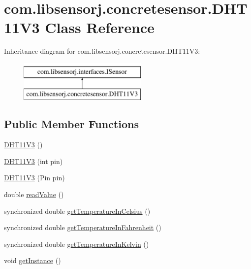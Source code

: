 \hypertarget{classcom_1_1libsensorj_1_1concretesensor_1_1DHT11V3}{}\section{com.\+libsensorj.\+concretesensor.\+D\+H\+T11\+V3 Class Reference}
\label{classcom_1_1libsensorj_1_1concretesensor_1_1DHT11V3}
Inheritance diagram for com.\+libsensorj.\+concretesensor.\+D\+H\+T11\+V3\+:\begin{figure}[H]
\begin{center}
\leavevmode
\includegraphics[height=2.000000cm]{classcom_1_1libsensorj_1_1concretesensor_1_1DHT11V3}
\end{center}
\end{figure}
\subsection*{Public Member Functions}
\begin{DoxyCompactItemize}
\item 
\hyperlink{classcom_1_1libsensorj_1_1concretesensor_1_1DHT11V3_a4996e16bdabeb71e35d8358a7e8248ca}{D\+H\+T11\+V3} ()
\item 
\hyperlink{classcom_1_1libsensorj_1_1concretesensor_1_1DHT11V3_a996dadcfe1bd20cd07d94be5c31b5453}{D\+H\+T11\+V3} (int pin)
\item 
\hyperlink{classcom_1_1libsensorj_1_1concretesensor_1_1DHT11V3_a1b40e6e4ec8ddd4df32c86d2dbe280b4}{D\+H\+T11\+V3} (Pin pin)
\item 
double \hyperlink{classcom_1_1libsensorj_1_1concretesensor_1_1DHT11V3_a15f5982dba996cc76bb7d0722ed70d31}{read\+Value} ()
\item 
synchronized double \hyperlink{classcom_1_1libsensorj_1_1concretesensor_1_1DHT11V3_afb1b93f01e2d40f12d9889217e5a37ee}{get\+Temperature\+In\+Celsius} ()
\item 
synchronized double \hyperlink{classcom_1_1libsensorj_1_1concretesensor_1_1DHT11V3_a7d1e369f920792870655add65dfed553}{get\+Temperature\+In\+Fahrenheit} ()
\item 
synchronized double \hyperlink{classcom_1_1libsensorj_1_1concretesensor_1_1DHT11V3_a3c8ecacf36b2b4d2de219dd9912b64b5}{get\+Temperature\+In\+Kelvin} ()
\item 
void \hyperlink{classcom_1_1libsensorj_1_1concretesensor_1_1DHT11V3_a94e402a3ea89ad3ee46725fdd64b4c82}{get\+Instance} ()
\end{DoxyCompactItemize}
